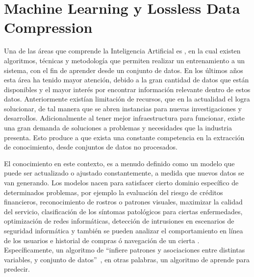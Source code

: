 
\chapter[Machine Learning y Lossless Data Compression]{Machine Learning y Lossless Data Compression}\label{ch:Compresion-Machine-Learning}


Una de las áreas que comprende la Inteligencia Artificial es \machinelearning, en la cual existen algoritmos, técnicas y metodología que permiten realizar un entrenamiento a un sistema, con el fin de aprender desde un conjunto de datos. En los últimos años esta área ha tenido mayor atención, debido a la gran cantidad de datos que están disponibles y el mayor interés por encontrar información relevante dentro de estos datos. Anteriormente existían limitación de recursos, que en la actualidad el \cloudcomputing logra solucionar, de tal manera que se abren instancias para nuevas investigaciones y desarrollos. Adicionalmente al tener mejor infraestructura para funcionar, existe una gran demanda de soluciones a problemas y necesidades que la industria presenta. Esto produce  a que exista una constante competencia en la extracción de conocimiento, desde conjuntos de datos no procesados.

El conocimiento en este contexto, es a menudo definido como un modelo que puede ser actualizado o ajustado constantemente, a medida que nuevos datos se van generando. Los modelos nacen para satisfacer cierto dominio específico de determinados problemas, por ejemplo la evaluación del riesgo de créditos financieros, reconocimiento de rostros o patrones visuales, maximizar la calidad del servicio, clasificación de los síntomas patológicos para ciertas enfermedades, optimización de redes informáticas, detección de intrusiones en escenarios de seguridad informática y también se pueden analizar el comportamiento en línea de los usuarios e historial de compras ó navegación  de un cierta \web. Específicamente, un algoritmo de \machinelearning ``infiere patrones y asociaciones entre distintas variables, y conjunto de datos''~\cite[capítulo 8]{guller2015big}, en otras palabras, un algoritmo de \machinelearning aprende para predecir. 


